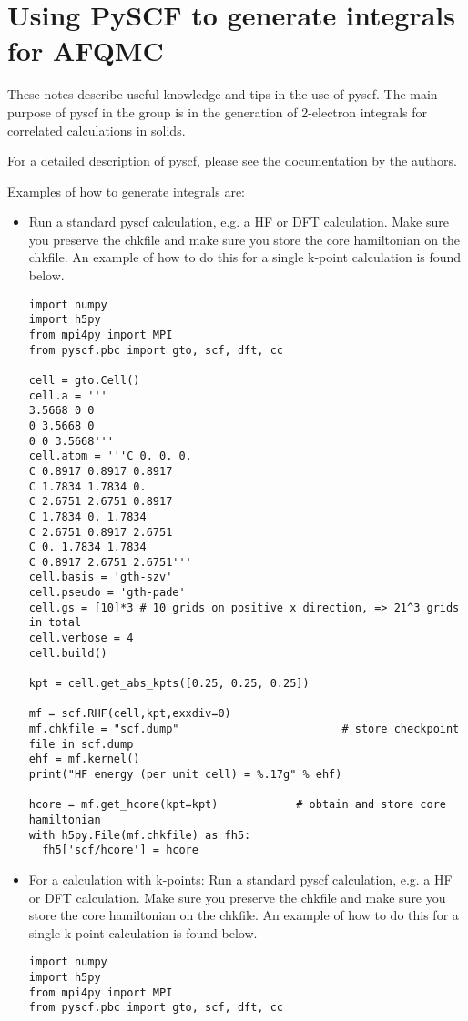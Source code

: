 \section{Using PySCF to generate integrals for AFQMC}
\label{sec:pyscf}
These notes describe useful knowledge and tips in the use of pyscf. 
The main purpose of pyscf in the group is in the generation of 2-electron integrals for correlated calculations in solids.

For a detailed description of pyscf, please see the documentation by the authors.

Examples of how to generate integrals are:
\begin{itemize}
\item Run a standard pyscf calculation, e.g. a HF or DFT calculation. Make sure you preserve the chkfile and make sure you store the core hamiltonian on the chkfile. An example of how to do this for a single k-point calculation is found below.
\begin{lstlisting}[caption=The following is an example PySCF input file for single k-point calculations.]
import numpy
import h5py
from mpi4py import MPI
from pyscf.pbc import gto, scf, dft, cc

cell = gto.Cell()
cell.a = '''
3.5668 0 0
0 3.5668 0
0 0 3.5668'''
cell.atom = '''C 0. 0. 0. 
C 0.8917 0.8917 0.8917
C 1.7834 1.7834 0. 
C 2.6751 2.6751 0.8917
C 1.7834 0. 1.7834
C 2.6751 0.8917 2.6751
C 0. 1.7834 1.7834
C 0.8917 2.6751 2.6751'''
cell.basis = 'gth-szv'
cell.pseudo = 'gth-pade'
cell.gs = [10]*3 # 10 grids on positive x direction, => 21^3 grids in total
cell.verbose = 4
cell.build()

kpt = cell.get_abs_kpts([0.25, 0.25, 0.25])  

mf = scf.RHF(cell,kpt,exxdiv=0)
mf.chkfile = "scf.dump"                         # store checkpoint file in scf.dump
ehf = mf.kernel()
print("HF energy (per unit cell) = %.17g" % ehf)

hcore = mf.get_hcore(kpt=kpt)            # obtain and store core hamiltonian
with h5py.File(mf.chkfile) as fh5:
  fh5['scf/hcore'] = hcore
\end{lstlisting}

\item {For a calculation with k-points:
Run a standard pyscf calculation, e.g. a HF or DFT calculation. Make sure you preserve the chkfile and make sure you store the core hamiltonian on the chkfile. An example of how to do this for a single k-point calculation is found below.}

\begin{lstlisting}[caption=The following is an example PySCF input file for calculations with k-points.]
import numpy
import h5py
from mpi4py import MPI
from pyscf.pbc import gto, scf, dft, cc


\end{lstlisting}
\end{itemize}

